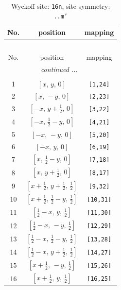 \documentclass[fleqn,8pt]{jsarticle}
\begin{document}
\renewcommand{\arraystretch}{1.2}
\begin{longtable}{ccc}
\caption{Wyckoff site: {\tt 16n}, site symmetry: {\tt ..m'}}
 \\
 \hline \hline
No. & position & mapping \\ \hline \endfirsthead

\multicolumn{2}{l}{\tablename\ \thetable{}} \\
 \hline \hline
No. & position & mapping \\ \hline \endhead

 \hline \hline
\multicolumn{2}{r}{\footnotesize\it continued ...} \\ \endfoot

 \hline \hline
\multicolumn{2}{r}{} \\ \endlastfoot

1 & $\left[ x,\, y,\, 0 \right]$ & {\tt [1,24]} \\ \hline
2 & $\left[ x,\, - y,\, 0 \right]$ & {\tt [2,23]} \\ \hline
3 & $\left[ - x,\, y + \frac{1}{2},\, 0 \right]$ & {\tt [3,22]} \\ \hline
4 & $\left[ - x,\, \frac{1}{2} - y,\, 0 \right]$ & {\tt [4,21]} \\ \hline
5 & $\left[ - x,\, - y,\, 0 \right]$ & {\tt [5,20]} \\ \hline
6 & $\left[ - x,\, y,\, 0 \right]$ & {\tt [6,19]} \\ \hline
7 & $\left[ x,\, \frac{1}{2} - y,\, 0 \right]$ & {\tt [7,18]} \\ \hline
8 & $\left[ x,\, y + \frac{1}{2},\, 0 \right]$ & {\tt [8,17]} \\ \hline
9 & $\left[ x + \frac{1}{2},\, y + \frac{1}{2},\, \frac{1}{2} \right]$ & {\tt [9,32]} \\ \hline
10 & $\left[ x + \frac{1}{2},\, \frac{1}{2} - y,\, \frac{1}{2} \right]$ & {\tt [10,31]} \\ \hline
11 & $\left[ \frac{1}{2} - x,\, y,\, \frac{1}{2} \right]$ & {\tt [11,30]} \\ \hline
12 & $\left[ \frac{1}{2} - x,\, - y,\, \frac{1}{2} \right]$ & {\tt [12,29]} \\ \hline
13 & $\left[ \frac{1}{2} - x,\, \frac{1}{2} - y,\, \frac{1}{2} \right]$ & {\tt [13,28]} \\ \hline
14 & $\left[ \frac{1}{2} - x,\, y + \frac{1}{2},\, \frac{1}{2} \right]$ & {\tt [14,27]} \\ \hline
15 & $\left[ x + \frac{1}{2},\, - y,\, \frac{1}{2} \right]$ & {\tt [15,26]} \\ \hline
16 & $\left[ x + \frac{1}{2},\, y,\, \frac{1}{2} \right]$ & {\tt [16,25]} \\
\end{longtable}
\end{document}
